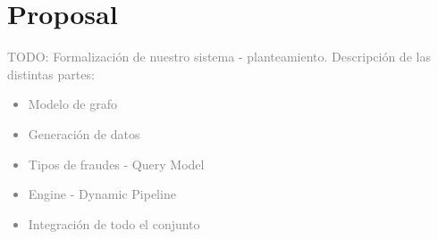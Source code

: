
\section{Proposal}

\textcolor{gray}{TODO: Formalización de nuestro sistema - planteamiento. Descripción de las distintas partes:
\begin{itemize}
    \item Modelo de grafo
    \item Generación de datos
    \item Tipos de fraudes - Query Model
    \item Engine - Dynamic Pipeline
    \item Integración de todo el conjunto
\end{itemize}
}





